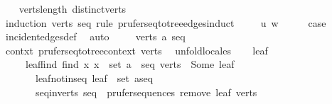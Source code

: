 \begin{isabellebody}
%
\isadelimproof
\ \ %
\endisadelimproof
%
\isatagproof
{}\isamarkupfalse%
\ verts{\isacharunderscore}{\kern0pt}length\ distinct{\isacharunderscore}{\kern0pt}verts\isanewline
{}\isamarkupfalse%
\ {\isacharparenleft}{\kern0pt}induction\ verts\ seq\ rule{\isacharcolon}{\kern0pt}\ prufer{\isacharunderscore}{\kern0pt}seq{\isacharunderscore}{\kern0pt}to{\isacharunderscore}{\kern0pt}tree{\isacharunderscore}{\kern0pt}edges{\isachardot}{\kern0pt}induct{\isacharparenright}{\kern0pt}\isanewline
\ \ \isamarkupfalse%
\ {\isacharparenleft}{\kern0pt}{}\ u\ w{\isacharparenright}{\kern0pt}\isanewline
\ \ \isamarkupfalse%
\ \isamarkupfalse%
\ {\isacharquery}{\kern0pt}case\ \isamarkupfalse%
\ incident{\isacharunderscore}{\kern0pt}edges{\isacharunderscore}{\kern0pt}def\ \isamarkupfalse%
\ auto\isanewline
{}\isamarkupfalse%
\isanewline
\ \ \isamarkupfalse%
\ {\isacharparenleft}{\kern0pt}{}\ verts\ a\ seq{\isacharparenright}{\kern0pt}\isanewline
\ \ \isamarkupfalse%
\ \isamarkupfalse%
\ contxt{\isacharcolon}{\kern0pt}\ prufer{\isacharunderscore}{\kern0pt}seq{\isacharunderscore}{\kern0pt}to{\isacharunderscore}{\kern0pt}tree{\isacharunderscore}{\kern0pt}context\ verts\ \isamarkupfalse%
\ unfold{\isacharunderscore}{\kern0pt}locales\isanewline
\ \ \isamarkupfalse%
\ leaf\isanewline
\ \ \ \ \ leaf{\isacharunderscore}{\kern0pt}find{\isacharcolon}{\kern0pt}\ {\isachardoublequoteopen}find\ {\isacharparenleft}{\kern0pt}{\isasymlambda}x{\isachardot}{\kern0pt}\ x\ {\isasymnotin}\ set\ {\isacharparenleft}{\kern0pt}a\ {\isacharhash}{\kern0pt}\ seq{\isacharparenright}{\kern0pt}{\isacharparenright}{\kern0pt}\ verts\ {\isacharequal}{\kern0pt}\ Some\ leaf{\isachardoublequoteclose}\isanewline
\ \ \ \ \ \ \ leaf{\isacharunderscore}{\kern0pt}not{\isacharunderscore}{\kern0pt}in{\isacharunderscore}{\kern0pt}seq{\isacharcolon}{\kern0pt}\ {\isachardoublequoteopen}leaf\ {\isasymnotin}\ set\ {\isacharparenleft}{\kern0pt}a{\isacharhash}{\kern0pt}seq{\isacharparenright}{\kern0pt}{\isachardoublequoteclose}\isanewline
\ \ \ \ \ \ \ seq{\isacharunderscore}{\kern0pt}in{\isacharunderscore}{\kern0pt}verts{\isacharprime}{\kern0pt}{\isacharcolon}{\kern0pt}\ {\isachardoublequoteopen}seq\ {\isasymin}\ prufer{\isacharunderscore}{\kern0pt}sequences\ {\isacharparenleft}{\kern0pt}remove{}\ leaf\ verts{\isacharparenright}{\kern0pt}{\isachardoublequoteclose}\isanewline

\end{isabellebody}
